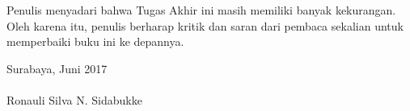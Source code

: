   \indent Penulis menyadari bahwa Tugas Akhir ini masih memiliki banyak kekurangan. Oleh karena itu, penulis berharap kritik dan saran dari pembaca sekalian untuk memperbaiki buku ini ke depannya.

  \hfill Surabaya, Juni 2017 \\ \\ 


  \hfill Ronauli Silva N. Sidabukke

\cleardoublepage %

